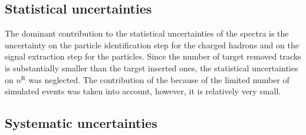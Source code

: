 \subsection{\boldmath Statistical uncertainties}
\label{sec:hadron:spec:stat}

The dominant contribution to the statistical uncertainties
of the spectra is the uncertainty on the particle identification
step for the charged hadrons and on the signal extraction step
for the \vzero particles.
Since the number of target removed tracks is substantially
smaller than the target inserted ones,  
the statistical uncertainties on $n^\text{R}$ was neglected.
The contribution of the \cmc because of the limited number of
simulated events was taken into account, however, it
is relatively very small. 


\subsection{\boldmath Systematic uncertainties}
\label{sec:hadron:spec:syst}

